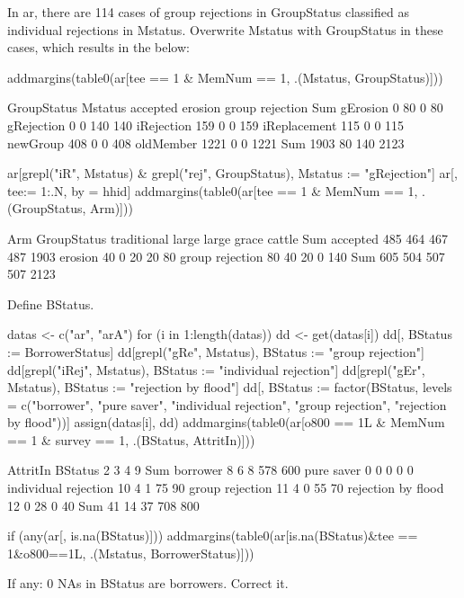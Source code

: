 In \textsf{ar}, there are 114 cases of group rejections in \textsf{GroupStatus} classified as individual rejections in \textsf{Mstatus}. Overwrite \textsf{Mstatus} with \textsf{GroupStatus} in these cases, which results in the below:
\begin{Schunk}
\begin{Sinput}
addmargins(table0(ar[tee == 1 & MemNum == 1, .(Mstatus, GroupStatus)]))
\end{Sinput}
\begin{Soutput}
              GroupStatus
Mstatus        accepted erosion group rejection  Sum
  gErosion            0      80               0   80
  gRejection          0       0             140  140
  iRejection        159       0               0  159
  iReplacement      115       0               0  115
  newGroup          408       0               0  408
  oldMember        1221       0               0 1221
  Sum              1903      80             140 2123
\end{Soutput}
\begin{Sinput}
ar[grepl("iR", Mstatus) & grepl("rej", GroupStatus), Mstatus := "gRejection"]
ar[, tee:= 1:.N, by = hhid]
addmargins(table0(ar[tee == 1 & MemNum == 1, .(GroupStatus, Arm)]))
\end{Sinput}
\begin{Soutput}
                 Arm
GroupStatus       traditional large large grace cattle  Sum
  accepted                485   464         467    487 1903
  erosion                  40     0          20     20   80
  group rejection          80    40          20      0  140
  Sum                     605   504         507    507 2123
\end{Soutput}
\end{Schunk}
Define \textsf{BStatus}.
\begin{Schunk}
\begin{Sinput}
datas <- c("ar", "arA")
for (i in 1:length(datas))
{
  dd <- get(datas[i])
  dd[, BStatus := BorrowerStatus]
  dd[grepl("gRe", Mstatus), BStatus := "group rejection"]
  dd[grepl("iRej", Mstatus), BStatus := "individual rejection"]
  dd[grepl("gEr", Mstatus), BStatus := "rejection by flood"]
  dd[, BStatus := factor(BStatus, levels = c("borrower", "pure saver", 
    "individual rejection", "group rejection", "rejection by flood"))]
  assign(datas[i], dd)
}
addmargins(table0(ar[o800 == 1L & MemNum == 1 & survey == 1, .(BStatus, AttritIn)]))
\end{Sinput}
\begin{Soutput}
                      AttritIn
BStatus                  2   3   4   9 Sum
  borrower               8   6   8 578 600
  pure saver             0   0   0   0   0
  individual rejection  10   4   1  75  90
  group rejection       11   4   0  55  70
  rejection by flood    12   0  28   0  40
  Sum                   41  14  37 708 800
\end{Soutput}
\begin{Sinput}
if (any(ar[, is.na(BStatus)])) 
  addmargins(table0(ar[is.na(BStatus)&tee == 1&o800==1L, .(Mstatus, BorrowerStatus)]))
\end{Sinput}
\end{Schunk}
If any: 0 NAs in \textsf{BStatus} are borrowers. Correct it.


